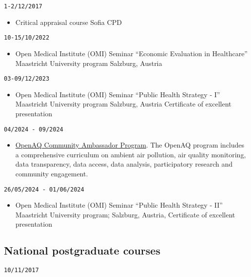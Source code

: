 \documentclass[
  12pt,
  letterpaper,
  DIV=11,
  numbers=noendperiod]{scrartcl}
\providecommand{\tightlist}{%
  \setlength{\itemsep}{0pt}\setlength{\parskip}{0pt}}\usepackage{longtable,booktabs,array}
\begin{document}
\texttt{1-2/12/2017}

\begin{itemize}
\tightlist
\item
  Critical appraisal course \textbar{} Sofia CPD
\end{itemize}

\texttt{10-15/10/2022}

\begin{itemize}
\tightlist
\item
  Open Medical Institute (OMI) Seminar \textbar{} ``Economic Evaluation
  in Healthcare'' \textbar{} Maastricht University program \textbar{}
  Salzburg, Austria
\end{itemize}

\texttt{03-09/12/2023}

\begin{itemize}
\tightlist
\item
  Open Medical Institute (OMI) Seminar \textbar{} ``Public Health
  Strategy - I'' \textbar{} Maastricht University program \textbar{}
  Salzburg, Austria \textbar{} Certificate of excellent presentation
\end{itemize}

\texttt{04/2024\ -\ 09/2024}

\begin{itemize}
\tightlist
\item
  \href{https://openaq.org/about/people/kostadin-kostadinov/}{OpenAQ
  Community Ambassador Program}. \textbar{} The OpenAQ program includes
  a comprehensive curriculum on ambient air pollution, air quality
  monitoring, data transparency, data access, data analysis,
  participatory research and community engagement.
\end{itemize}

\texttt{26/05/2024\ -\ 01/06/2024}

\begin{itemize}
\tightlist
\item
  Open Medical Institute (OMI) Seminar \textbar{} ``Public Health
  Strategy - II'' \textbar{} Maastricht University program; Salzburg,
  Austria, Certificate of excellent presentation
\end{itemize}

\subsection{National postgraduate
courses}\label{national-postgraduate-courses}

\texttt{10/11/2017}
\end{document}
